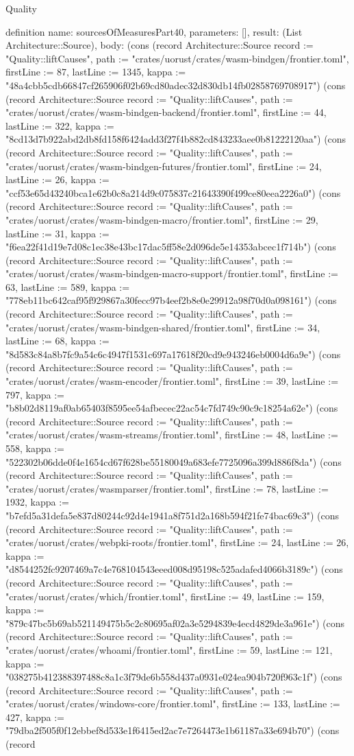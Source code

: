 \begin{lexlean}{Quality}
\begin{semanticmodule}
definition{
  name: sourcesOfMeasuresPart40,
  parameters: [],
  result: (List Architecture::Source),
  body: (cons (record Architecture::Source {record := "Quality::liftCauses", path := "crates/uorust/crates/wasm-bindgen/frontier.toml", firstLine := 87, lastLine := 1345, kappa := "48a4cbb5cdb66847cf265906f02b69cd80adec32d830db14fb02858769708917"}) (cons (record Architecture::Source {record := "Quality::liftCauses", path := "crates/uorust/crates/wasm-bindgen-backend/frontier.toml", firstLine := 44, lastLine := 322, kappa := "8cd13d7b922abd2db8fd158f6424add3f27f4b882cd843233aee0b81222120aa"}) (cons (record Architecture::Source {record := "Quality::liftCauses", path := "crates/uorust/crates/wasm-bindgen-futures/frontier.toml", firstLine := 24, lastLine := 26, kappa := "ccf53e65d43240bca1e62b0c8a214d9c075837c21643390f499ce80eea2226a0"}) (cons (record Architecture::Source {record := "Quality::liftCauses", path := "crates/uorust/crates/wasm-bindgen-macro/frontier.toml", firstLine := 29, lastLine := 31, kappa := "f6ea22f41d19e7d08c1ec38e43bc17dac5ff58e2d096de5e14353abcec1f714b"}) (cons (record Architecture::Source {record := "Quality::liftCauses", path := "crates/uorust/crates/wasm-bindgen-macro-support/frontier.toml", firstLine := 63, lastLine := 589, kappa := "778eb11bc642caf95f929867a30fecc97b4eef2b8e0e29912a98f70d0a098161"}) (cons (record Architecture::Source {record := "Quality::liftCauses", path := "crates/uorust/crates/wasm-bindgen-shared/frontier.toml", firstLine := 34, lastLine := 68, kappa := "8d583c84a8b7fc9a54c6c4947f1531c697a17618f20cd9e943246eb0004d6a9e"}) (cons (record Architecture::Source {record := "Quality::liftCauses", path := "crates/uorust/crates/wasm-encoder/frontier.toml", firstLine := 39, lastLine := 797, kappa := "b8b02d8119af0ab65403f8595ee54afbecec22ac54c7fd749c90c9c18254a62e"}) (cons (record Architecture::Source {record := "Quality::liftCauses", path := "crates/uorust/crates/wasm-streams/frontier.toml", firstLine := 48, lastLine := 558, kappa := "522302b06dde0f4e1654cd67f628be55180049a683efe7725096a399d886f8da"}) (cons (record Architecture::Source {record := "Quality::liftCauses", path := "crates/uorust/crates/wasmparser/frontier.toml", firstLine := 78, lastLine := 1932, kappa := "b7efd5a31defa5e837d80244c92d4e1941a8f751d2a168b594f21fe74bac69c3"}) (cons (record Architecture::Source {record := "Quality::liftCauses", path := "crates/uorust/crates/webpki-roots/frontier.toml", firstLine := 24, lastLine := 26, kappa := "d8544252fc9207469a7c4e768104543eeed008d95198c525adafed4066b3189c"}) (cons (record Architecture::Source {record := "Quality::liftCauses", path := "crates/uorust/crates/which/frontier.toml", firstLine := 49, lastLine := 159, kappa := "879c47bc5b69ab521149475b5c2c80695af02a3e5294839e4ecd4829de3a961e"}) (cons (record Architecture::Source {record := "Quality::liftCauses", path := "crates/uorust/crates/whoami/frontier.toml", firstLine := 59, lastLine := 121, kappa := "038275b412388397488c8a1c3f79de6b558d437a0931e024ea904b720f963c1f"}) (cons (record Architecture::Source {record := "Quality::liftCauses", path := "crates/uorust/crates/windows-core/frontier.toml", firstLine := 133, lastLine := 427, kappa := "79dba2f505f0f12ebbef8d533e1f6415ed2ac7e7264473e1b61187a33e694b70"}) (cons (record }
\end{semanticmodule}
\end{lexlean}
